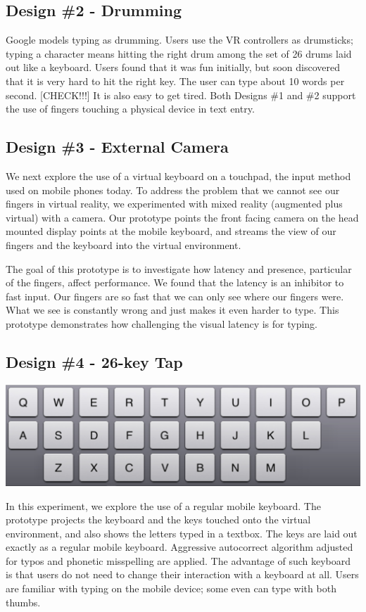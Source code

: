 \subsection{Design \#2 - Drumming}
Google models typing as drumming.  Users use the VR controllers as drumsticks; typing a character means hitting the right drum among the set of 26 drums laid out like a keyboard. Users found that it was fun initially, but soon discovered that it is very hard to hit the right key.   The user can type about 10 words per second. [CHECK!!!]
It is also easy to get tired. 
Both Designs \#1 and \#2 support the use of fingers touching a physical device in text entry. 

\subsection{Design \#3 - External Camera}

We next explore the use of a virtual keyboard on a touchpad, the input method used on mobile phones today.  To address the problem that we cannot see our fingers in virtual reality, we experimented with mixed reality (augmented plus virtual) with a camera.  Our prototype points the front facing camera on the head mounted display points at the mobile keyboard, and streams the view of our fingers and the keyboard into the virtual environment. 

The goal of this prototype is to investigate how latency and presence, particular of the fingers, affect performance.  We found that the latency is an inhibitor to fast input.  Our fingers are so fast that we can only see where our fingers were.  What we see is constantly wrong and just makes it even harder to type.  This prototype demonstrates how challenging the visual latency is for typing. 

\subsection{Design \#4 - 26-key Tap}
\vspace*{.1cm}
\includegraphics[width=.9\columnwidth]{figures/26Tap}

In this experiment, we explore the use of a regular mobile keyboard.  The prototype projects the keyboard and the keys touched onto the virtual environment, and also shows the letters typed in a textbox.  The keys are laid out exactly as a regular mobile keyboard. 
Aggressive autocorrect algorithm adjusted for typos and phonetic misspelling are applied.
The advantage of such keyboard is that users do not need to change their interaction with a keyboard at all.  Users are familiar with typing on the mobile device; some even can type with both thumbs.  


